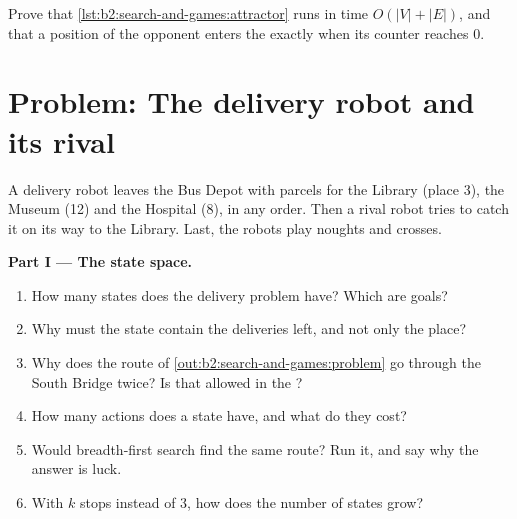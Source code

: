\begin{exercise}[$\star\star\star$]\label{exo:b2:search-and-games:12}
Prove that \cref{lst:b2:search-and-games:attractor} runs in time $O(|V| + |E|)$, and that a position of the opponent
enters the  exactly when its counter reaches $0$.
\end{exercise}

\section{Problem: The delivery robot and its rival}\label{sec:b2:search-and-games:problem}

\begin{problem}\label{pb:b2:search-and-games:1}
A delivery robot leaves the Bus Depot with parcels for the Library (place 3), the Museum (12) and the Hospital (8), in any
order. Then a rival robot tries to catch it on its way to the Library. Last, the robots play noughts and crosses.

\label{lst:b2:search-and-games:problem}

\label{out:b2:search-and-games:problem}

\medskip\noindent\textbf{Part I --- The state space.}\par\nopagebreak
\begin{enumerate}
\item How many states does the delivery problem have? Which are goals?
\item Why must the state contain the deliveries left, and not only the place?
\item Why does the route of \cref{out:b2:search-and-games:problem} go through the South Bridge twice? Is that allowed in
the ?
\item How many actions does a state have, and what do they cost?
\item Would breadth-first search find the same route? Run it, and say why the answer is luck.
\item With $k$ stops instead of 3, how does the number of states grow?
\end{enumerate}


\end{problem}
